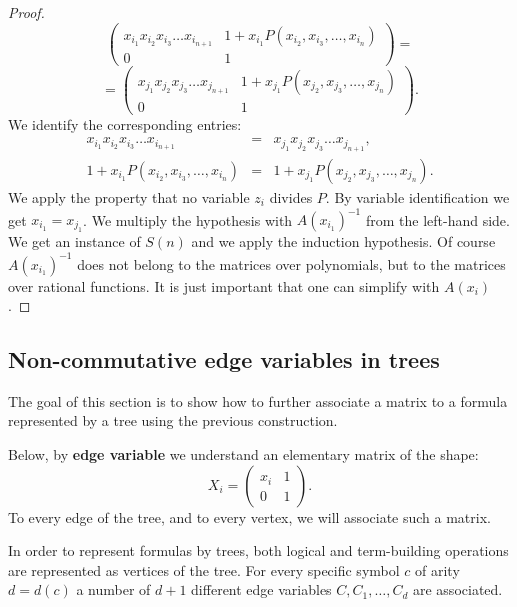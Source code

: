 \documentclass{article}
\theoremstyle{plain}
\theoremstyle{definition}
\begin{document}
\begin{proof}
$$\begin{pmatrix}
        x_{i_1} x_{i_2}x_{i_3} \dots x_{i_{n+1}} & 1 + x_{i_1} P(x_{i_2}, x_{i_3}, \dots, x_{i_{n}}) \\ 0 & 1
    \end{pmatrix} = $$$$ =
      \begin{pmatrix}
        x_{j_1} x_{j_2}x_{j_3} \dots x_{j_{n+1}} & 1 + x_{j_1} P(x_{j_2}, x_{j_3}, \dots, x_{j_{n}}) \\ 0 & 1
    \end{pmatrix}.
     $$
     We identify the corresponding entries:
     \begin{eqnarray*}
          x_{i_1} x_{i_2}x_{i_3} \dots x_{i_{n+1}} &=& 
           x_{j_1} x_{j_2}x_{j_3} \dots x_{j_{n+1}}, \\
           1 + x_{i_1} P(x_{i_2}, x_{i_3}, \dots, x_{i_{n}}) &=&
           1 + x_{j_1} P(x_{j_2}, x_{j_3}, \dots, x_{j_{n}}).
     \end{eqnarray*} 
     We apply the property that no variable $z_i$ divides $P$. By variable identification we get $x_{i_1} = x_{j_1}$. We multiply the hypothesis with $A(x_{i_1})^{-1}$ from the left-hand side. We get an instance of $S(n)$ and we apply the induction hypothesis. Of course  $A(x_{i_1})^{-1}$ does not belong to the matrices over polynomials, but to the matrices over rational functions. It is just important that one can simplify with $A(x_i)$. 
\end{proof}

\subsection{Non-commutative edge variables in trees}\label{treesandpolynomials} 

 The goal of this section is to show how to further associate a matrix to a formula represented by a tree using the previous construction.

 Below, by {\bf edge variable} we understand an elementary matrix of the shape:
 $$X_i = \begin{pmatrix}
     x_i & 1 \\ 0 & 1
 \end{pmatrix}.$$
 To every edge of the tree, and to every vertex, we will associate such a matrix. 

In order to represent formulas by trees, both logical and term-building operations are represented as vertices of the tree. For every specific symbol $c$ of arity $d=d(c)$ a number of $d + 1$ different edge variables $C, C_1, \dots, C_d$ are associated. 
\end{document}
